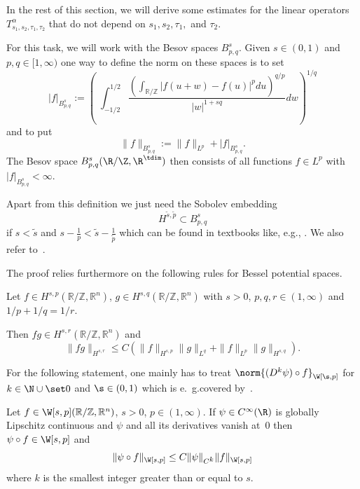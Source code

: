 In the rest of this section, we will derive some estimates for the linear operators $T^\alpha_{s_1,s_2, \tau_1, \tau_2}$
that do not depend on $s_1,s_2, \tau_1,$ and $\tau_2$.

For this task, we will work with the Besov spaces $B^{s}_{p,q}$.
Given $s \in (0,1)$ and $p,q \in [1,\infty)$ one way to define the norm on these spaces 
is to set
\begin{equation*}
 |f|_{B^{s}_{p,q}} := \left(\;\int_{-1/2}^{1/2} 
  \frac {\left(\int_{\mathbb R / \mathbb Z}|f(u+w)-f(u)|^p du \right)^{q/p}}{|w|^{1+sq}} dw\right)^{1/q} 
\end{equation*}
 and to put 
\begin{equation*}
 \|f\|_{B^{s}_{p,q}} := \|f\|_{L^p} + |f|_{B^{s}_{p,q}}.
\end{equation*}
The Besov space $B^{s}_{p,q}(\R / \Z, \R^\tdim)$ then consists of all functions $f\in L^p$ with
$|f|_{B^s_{p,q}} < \infty$.

Apart from this definition we just need the Sobolev embedding
\begin{equation*}
 H^{\tilde s, \tilde p} \subset B^{s}_{p,q} 
\end{equation*}
if $s < \tilde s$ and $s- \frac 1 p < \tilde s - \frac 1 {\tilde p}$ which can be found
in textbooks like, e.g., \cite{Triebel,RS,Tartar2007}.
We also refer to~\cite{DiNezza}.

The proof relies furthermore on the following rules for 
Bessel potential spaces.

\begin{lemma} \label{lem:LeibnizRule}
Let $f \in H^{s,p}(\mathbb R / \mathbb Z, \mathbb R^n)$, $g \in H^{s,q}(\mathbb R / \mathbb Z, \mathbb R^n)$
with $s >0$, $p,q,r \in (1,\infty)$ and $1/p + 1/q = 1/r$.
 
Then $fg \in H^{s,r}(\mathbb R / \mathbb Z, \mathbb R^n) $ and
\begin{equation*}
 \|fg\|_{H^{s,r}} \leq C \left( \|f\|_{H^{s,p}} \|g\|_{L^q} + \|f\|_{L^p} \|g\|_{H^{s,q}}\right).
\end{equation*}

\end{lemma}

For the following statement, one mainly has to treat $\norm{(D^k\psi)\circ f}_{\W[\s,p]}$ for $k\in\N\cup\set0$ and $\s\in(0,1)$
which is e.~g.\@ covered by~\cite[Thm.~5.3.6/1~(i)]{RS}.

\begin{lemma}\label{lem:chain}
 Let $f\in\W[s,p](\mathbb R / \mathbb Z, \mathbb R^n)$, $s > 0$, $p \in (1,\infty)$.
 If $\psi\in C^\infty(\R)$ is globally Lipschitz continuous and $\psi$ and all its derivatives vanish at~$0$ then $\psi\circ f\in\W[s,p]$ and
 \[ \|\psi \circ f\|_{\W[s,p]} \le C\|\psi\|_{C^{\scriptstyle k}}\|f\|_{\W[s,p]} \]
 where $k$ is the smallest integer greater than or equal to $s$.
\end{lemma}


